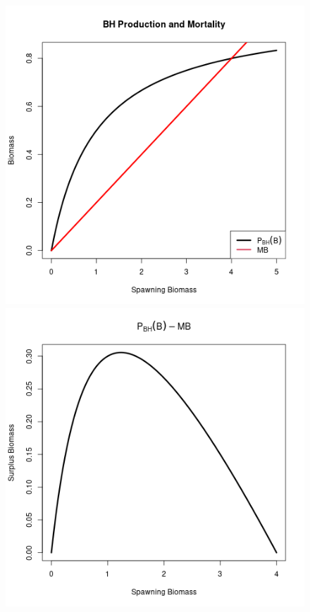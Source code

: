 \begin{figure}[h!]
\begin{minipage}[h!]{0.49\textwidth}
        \includegraphics[width=\textwidth]{../gpBias/pBHandM.png}
\end{minipage}
\begin{minipage}[h!]{0.49\textwidth}
	\includegraphics[width=\textwidth]{../gpBias/yeildBH.png}

\end{minipage}
\end{figure}
